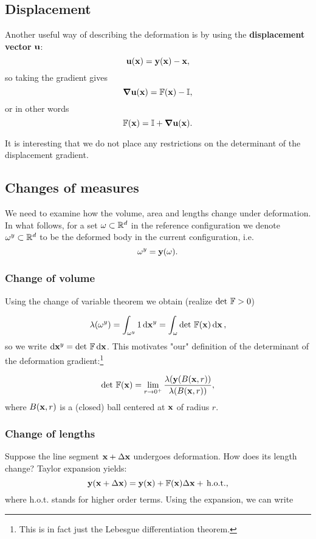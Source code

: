 \documentclass[11pt]{scrartcl} %
\begin{document}
\subsection{Displacement}
\label{sec:displacement}
Another useful way of describing the deformation is by using the \textbf{displacement vector} $\vb{u}$:
\[
	\vb{u}(\vb{x}) = \vb{y}(\vb{x}) - \vb{x},
\]
so taking the gradient gives
\[
	\grad{\vb{u}(\vb{x})} = \mathbb{F}(\vb{x}) - \mathbb{I},
\]
or in other words
\[
	\mathbb{F}\qty(\vb{x}) = \mathbb{I} + \grad \vb{u}\qty(\vb{x}).
\]
\begin{remark}
It is interesting that we do not place any restrictions on the determinant of the displacement gradient.
\end{remark}

\subsection{Changes of measures}
\label{sec:changes}

We need to examine how the volume, area and lengths change under deformation. In what follows, for a set $\omega \subset {\mathbb R}^d$ in the reference configuration we denote $\omega^y \subset {\mathbb R}^d$ to be the deformed body in the current configuration, i.e.
\[
	\omega^y = \vb{y}(\omega).
\]

\subsubsection{Change of volume}
\label{sec:Change of volume}
Using the change of variable theorem we obtain (realize $\det\, \mathbb{F} > 0$)

\begin{equation*}
	\lambda(\omega^y) = \int_{\omega^y} 1 \dd{\vb{x}^y} = \int_\omega \det\, \mathbb{F}(\vb{x}) \dd{\vb{x}},
\end{equation*}
so we write $\dd{\vb{x}^y} = \det\, \mathbb{F} \dd{\vb{x}}$. This motivates "our" definition of the determinant of the deformation gradient:\footnote{This is in fact just the Lebesgue differentiation theorem.}

\begin{equation}
\label{eq:detfdefinition}
\det\, \mathbb{F} (\vb{x}) = \lim_{r\to 0^+} \frac{\lambda(\vb{y}\qty(B(\vb{x},r))}{\lambda(B(\vb{x},r))} ,
\end{equation}
where $B(\vb{x},r)$ is a (closed) ball centered at $\vb{x}$ of radius $r$.

\subsubsection{Change of lengths}
\label{sec:chlengths}
Suppose the line segment $\vb{x}+\Delta \vb{x}$ undergoes deformation. How does its length change?
Taylor expansion yields:
\begin{equation*}
	\vb{y}(\vb{x}+\Delta \vb{x})= \vb{y}(\vb{x}) + \mathbb{F}(\vb{x})\Delta \vb{x} + \, \text{h.o.t.},
\end{equation*}
where h.o.t. stands for higher order terms. Using the expansion, we can write
\end{document}
